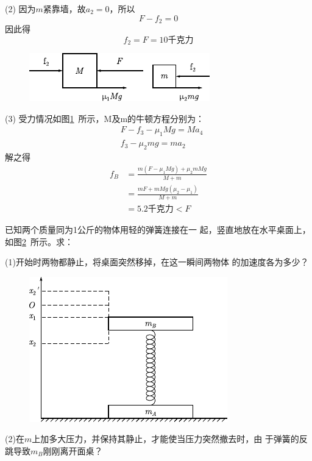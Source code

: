 (2) 因为$ m $紧靠墙，故$ a _ { 2 } = 0 $，所以
\begin{equation*}
 F - f _ { 2 } = 0
\end{equation*}
因此得
\begin{equation*}
 f _ { 2 } = F = 1 0 \text{千克力}
\end{equation*}

\begin{figure}
    \centering
    \includegraphics{figure/fig03.10}
    \caption{}
    \label{fig:03.10}
\end{figure}
(3) 受力情况如图\ref{fig:03.10}~所示，M及m的牛顿方程分别为：
{\setlength{\mathindent}{2em}
\begin{align*}
 &F - f _ { 3 } - \mu _ { 1 } M g = M a _ { 4 } \\
 &f _ { 3 } - \mu _ { 2 } m g = m a _ { 2 }
\end{align*}}
解之得
\begin{align*}
 f _ { B } &= \frac { m ( F - \mu _ { 1 } M g ) + \mu _ { 2 } m M g } { M + m } \\
  &= \frac { m F + m M g ( \mu _ { 2 } - \mu _ { 1 } ) } { M + m } \\
  &= 5.2 \text{千克力} < F
\end{align*}

\example 已知两个质量同为1公斤的物体用轻的弹簧连接在一
起，竖直地放在水平桌面上，如图\ref{fig:03.11}~所示。求：

(1)开始时两物都静止，将桌面突然移掉，在这一瞬间两物体
的加速度各为多少？

\begin{figure}
    \centering
    \includegraphics{figure/fig03.11}
    \caption{}
    \label{fig:03.11}
\end{figure}
(2)在$ m $上加多大压力，并保持其静止，才能使当压力突然撤去时，由
于弹簧的反跳导致$ m_B $刚刚离开面桌？

